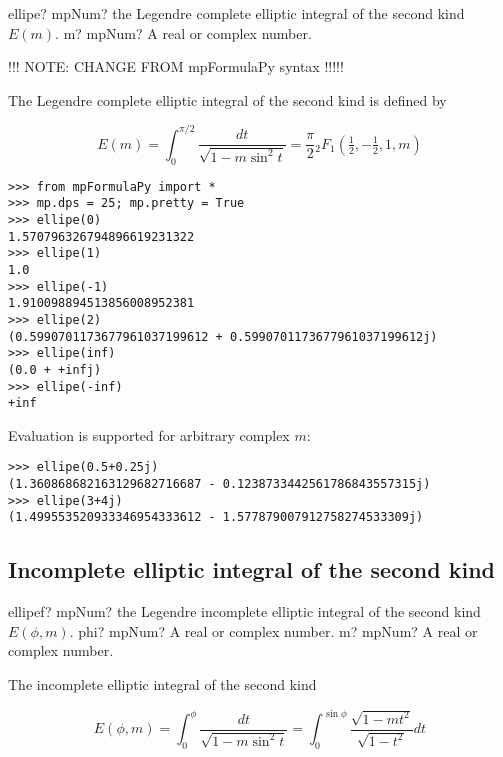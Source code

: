 \begin{mpFunctionsExtract}
	\mpFunctionOne
	{ellipe? mpNum? the Legendre complete elliptic integral of the second kind $E(m)$.}
	{m? mpNum? A real or complex number.}	
\end{mpFunctionsExtract}


!!! NOTE: CHANGE FROM mpFormulaPy syntax !!!!!

\vpara
The Legendre complete elliptic integral of the second kind is defined by

\begin{equation}
E(m)=\int_0^{\pi/2} \frac{dt}{\sqrt{1-m \sin^2 t}} = \frac{\pi}{2} {}_2F_1 \left(\tfrac{1}{2},-\tfrac{1}{2},1,m \right)
\end{equation}


\begin{lstlisting}
>>> from mpFormulaPy import *
>>> mp.dps = 25; mp.pretty = True
>>> ellipe(0)
1.570796326794896619231322
>>> ellipe(1)
1.0
>>> ellipe(-1)
1.910098894513856008952381
>>> ellipe(2)
(0.5990701173677961037199612 + 0.5990701173677961037199612j)
>>> ellipe(inf)
(0.0 + +infj)
>>> ellipe(-inf)
+inf
\end{lstlisting}

Evaluation is supported for arbitrary complex $m$:

\begin{lstlisting}
>>> ellipe(0.5+0.25j)
(1.360868682163129682716687 - 0.1238733442561786843557315j)
>>> ellipe(3+4j)
(1.499553520933346954333612 - 1.577879007912758274533309j)
\end{lstlisting}



\subsection{Incomplete elliptic integral of the second kind}

\begin{mpFunctionsExtract}
	\mpFunctionTwo
	{ellipef? mpNum? the Legendre incomplete elliptic integral of the second kind $E(\phi,m)$.}
	{phi? mpNum? A real or complex number.}
	{m? mpNum? A real or complex number.}	
\end{mpFunctionsExtract}

\vpara
The incomplete elliptic integral of the second kind

\begin{equation}
E(\phi,m)=\int_0^{\phi} \frac{dt}{\sqrt{1-m \sin^2 t}} =\int_0^{\sin \phi} \frac{\sqrt{1-mt^2}}{\sqrt{1-t^2}} dt
\end{equation}

